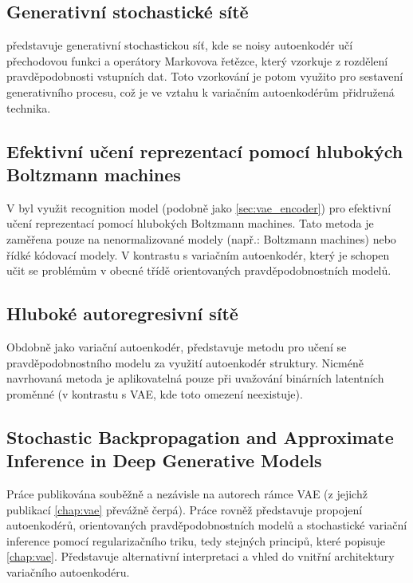 \subsection{Generativní stochastické sítě}
\cite{Bengio2014a} představuje generativní stochastickou síť, kde se noisy autoenkodér učí přechodovou funkci a operátory Markovova řetězce, který vzorkuje z rozdělení pravděpodobnosti vstupních dat.  Toto vzorkování je potom využito pro sestavení generativního procesu, což je ve vztahu k variačním autoenkodérům přidružená technika. \cite{Kingma2019}

\subsection{Efektivní učení reprezentací pomocí hlubokých Boltzmann machines}
V \cite{Salakhutdinov2010} byl využit recognition model (podobně jako \autoref{sec:vae_encoder}) pro efektivní učení reprezentací pomocí hlubokých Boltzmann machines. 
Tato metoda je zaměřena pouze na nenormalizované modely (např.: Boltzmann machines) nebo řídké kódovací modely. V kontrastu s variačním autoenkodér, který je schopen učit se problémům v obecné třídě orientovaných pravděpodobnostních modelů. \cite{Kingma2019}

\subsection{Hluboké autoregresivní sítě}
Obdobně jako variační autoenkodér, \cite{Gregor2014} představuje metodu pro učení se pravděpodobnostního modelu za využití autoenkodér struktury. Nicméně navrhovaná metoda je aplikovatelná pouze při uvažování binárních latentních proměnné (v kontrastu s VAE, kde toto omezení neexistuje). \cite{Kingma2019}

\subsection{Stochastic Backpropagation and Approximate Inference in Deep Generative Models}
Práce publikována souběžně a nezávisle na autorech rámce VAE (z jejichž publikací \autoref{chap:vae} převážně čerpá). Práce \cite{Rezende2014} rovněž představuje propojení autoenkodérů, orientovaných pravděpodobnostních modelů a stochastické variační inference pomocí regularizačního triku, tedy stejných principů, které popisuje \autoref{chap:vae}.
Představuje alternativní interpretaci a vhled do vnitřní architektury variačního autoenkodéru.

